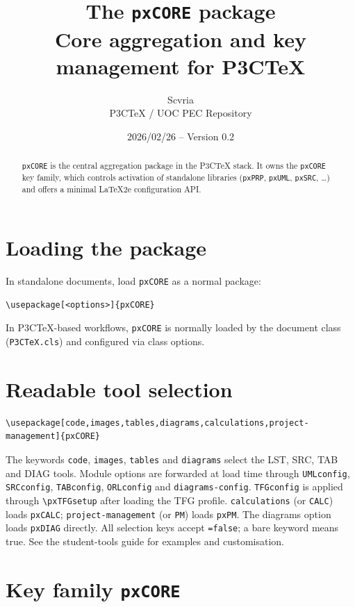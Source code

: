 \documentclass[11pt,a4paper]{article}
\title{The \texttt{pxCORE} package\\
  \large Core aggregation and key management for P3CTeX}
\author{Scvria\\P3CTeX / UOC PEC Repository}
\date{2026/02/26 -- Version 0.2}
\begin{document}
\maketitle

\begin{abstract}
  \texttt{pxCORE} is the central aggregation package in the P3CTeX stack.
  It owns the \texttt{pxCORE} key family, which controls activation of
  standalone libraries (\texttt{pxPRP}, \texttt{pxUML}, \texttt{pxSRC}, \dots)
  and offers a minimal LaTeX2e configuration API.
\end{abstract}

\tableofcontents

\section{Loading the package}

In standalone documents, load \texttt{pxCORE} as a normal package:

\begin{verbatim}
\usepackage[<options>]{pxCORE}
\end{verbatim}

In P3CTeX-based workflows, \texttt{pxCORE} is normally loaded by the
document class (\texttt{P3CTeX.cls}) and configured via class options.

\section{Readable tool selection}
\begin{verbatim}
\usepackage[code,images,tables,diagrams,calculations,project-management]{pxCORE}
\end{verbatim}
The keywords \texttt{code}, \texttt{images}, \texttt{tables} and
\texttt{diagrams} select the LST, SRC, TAB and DIAG tools.
Module options are forwarded at load time through \texttt{UMLconfig},
\texttt{SRCconfig}, \texttt{TABconfig}, \texttt{ORLconfig} and
\texttt{diagrams-config}. \texttt{TFGconfig} is applied through
\verb|\pxTFGsetup| after loading the TFG profile.
\texttt{calculations} (or \texttt{CALC}) loads \texttt{pxCALC};
\texttt{project-management} (or \texttt{PM}) loads \texttt{pxPM}.
The diagrams option loads \texttt{pxDIAG} directly.
All selection keys accept \texttt{=false}; a bare keyword means true.
See the student-tools guide for examples and customisation.

\section{Key family \texttt{pxCORE}}
\end{document}
